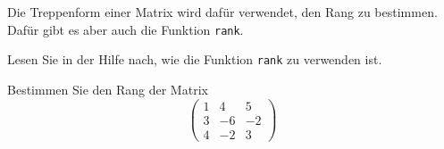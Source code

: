 Die Treppenform einer Matrix wird dafür verwendet, den Rang zu
bestimmen. Dafür gibt es aber auch die Funktion {\tt rank}.
\begin{teilaufgaben}
\item Lesen Sie in der Hilfe nach, wie die Funktion {\tt rank}
zu verwenden ist.
\item Bestimmen Sie den Rang der Matrix
\[
\begin{pmatrix}
1&4&5\\
3&-6&-2\\
4&-2&3
\end{pmatrix}
\]
\end{teilaufgaben}


\begin{loesung}
\begin{teilaufgaben}
\item
\item
{}
\end{teilaufgaben}
\end{loesung}

